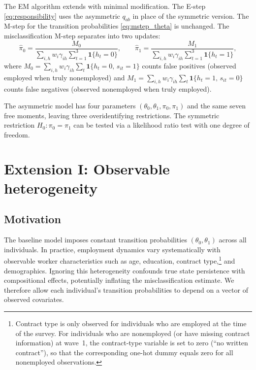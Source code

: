 \documentclass[12pt]{article}
\begin{document}
The EM algorithm extends with minimal modification. The E-step
\eqref{eq:responsibility} uses the asymmetric \(q_{ab}\) in place of
the symmetric version. The M-step for the transition probabilities
\eqref{eq:mstep_theta} is unchanged. The misclassification M-step
separates into two updates:
\begin{equation}
\hat{\pi}_0 = \frac{M_0}{\sum_{i,h} w_i \gamma_{ih}
  \sum_{t=1}^{3} \mathbf{1}\{h_t = 0\}}, \qquad
\hat{\pi}_1 = \frac{M_1}{\sum_{i,h} w_i \gamma_{ih}
  \sum_{t=1}^{3} \mathbf{1}\{h_t = 1\}},
\label{eq:mstep_asymmetric}
\end{equation}
where
\(M_0 = \sum_{i,h} w_i \gamma_{ih}
\sum_{t} \mathbf{1}\{h_t = 0,\, s_{it} = 1\}\)
counts false positives (observed employed when truly nonemployed) and
\(M_1 = \sum_{i,h} w_i \gamma_{ih}
\sum_{t} \mathbf{1}\{h_t = 1,\, s_{it} = 0\}\)
counts false negatives (observed nonemployed when truly employed).

The asymmetric model has four parameters
\((\theta_0, \theta_1, \pi_0, \pi_1)\) and the same seven free moments,
leaving three overidentifying restrictions. The symmetric restriction
\(H_0: \pi_0 = \pi_1\) can be tested via a likelihood ratio test with
one degree of freedom.

\section{Extension I: Observable heterogeneity}
\label{sec:covariates}

\subsection{Motivation}

The baseline model imposes constant transition probabilities
\((\theta_0, \theta_1)\) across all individuals. In practice, employment
dynamics vary systematically with observable worker characteristics such as
age, education, contract type,\footnote{Contract type is only observed for
individuals who are employed at the time of the survey. For individuals who
are nonemployed (or have missing contract information) at wave~1, the
contract-type variable is set to zero (``no written contract''), so that
the corresponding one-hot dummy equals zero for all nonemployed
observations.} and demographics. Ignoring this heterogeneity
confounds true state persistence with compositional effects, potentially
inflating the misclassification estimate. We therefore allow each
individual's transition probabilities to depend on a vector of observed
covariates.
\end{document}

